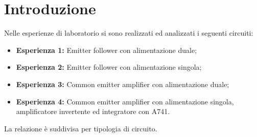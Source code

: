 \documentclass{report}
\begin{document}
\addtocounter{chapter}{-1}
	\begin{frontespizio}
		\Margini{3cm}{3cm}{3cm}{3cm}
		\Punteggiatura{}
		\begin{Preambolo*}
			\usepackage[italian]{babel}
			\usepackage[T1]{fontenc}
			\usepackage[utf8]{inputenc}
			\usepackage{microtype}
			\usepackage{lmodern}
			\graphicspath{{img/}}
			
			\renewcommand{\frontinstitutionfont}{\fontsize{14}{17}\bfseries\scshape}
			\renewcommand{\fronttitlefont}{\fontsize{17}{21}\bfseries\scshape}
			\renewcommand{\frontfootfont}{\fontsize{12}{14}\bfseries\scshape}
		\end{Preambolo*}
	\end{frontespizio}



\newpage
\null
\thispagestyle{empty}
\newpage

\tableofcontents

\newpage
\null
\newpage

\chapter{Introduzione}
Nelle esperienze di laboratorio si sono realizzati ed analizzati i seguenti circuiti:
\begin{itemize}
\item \textbf{Esperienza 1:} Emitter follower con alimentazione duale; 
\item \textbf{Esperienza 2:} Emitter follower con alimentazione singola; 
\item \textbf{Esperienza 3:} Common emitter amplifier con alimentazione duale; 
\item \textbf{Esperienza 4:} Common emitter amplifier con alimentazione singola, amplificatore invertente ed integratore con 	\textmu A741.
\end{itemize}
La relazione è suddivisa per tipologia di circuito.
\end{document}
